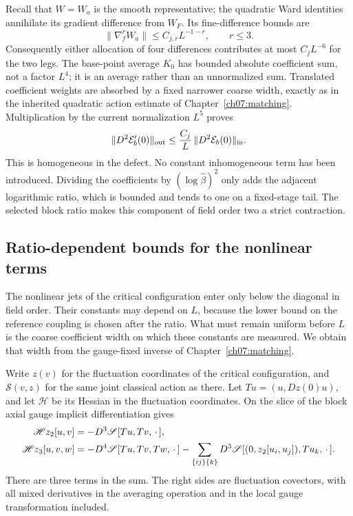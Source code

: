 Recall that $W=W_a$ is the smooth representative; the quadratic Ward
identities annihilate its gradient difference from $W_F$.
Its fine-difference bounds are
\[
                  \|\nabla_f^rW_a\|\le C_{j,r}L^{-1-r},
                                  \qquad r\le3.
\]
Consequently either allocation of four differences contributes at most
$C_jL^{-6}$ for the two legs. The base-point average $K_0$ has bounded
absolute coefficient sum, not a factor $L^4$; it is an average rather
than an unnormalized sum. Translated coefficient weights are absorbed
by a fixed narrower coarse width, exactly as in the inherited quadratic
action estimate of Chapter~\ref{ch07:matching}. Multiplication by the
current normalization $L^5$ proves
\begin{equation}
             \|D^2\mathcal E'_b(0)\|_{\rm out}
                  \le \frac{C_j}{L}\,
                            \|D^2\mathcal E_b(0)\|_{\rm in}.
 \label{ch17:quadratic-current-contraction}
\end{equation}
This is homogeneous in the defect. No constant inhomogeneous term has
been introduced. Dividing the coefficients by $(\log\widehat\beta)^2$
only adds the adjacent logarithmic ratio, which is bounded and tends
to one on a fixed-stage tail. The selected block ratio makes this
component of field order two a strict contraction.

\subsection{Ratio-dependent bounds for the nonlinear terms}

The nonlinear jets of the critical configuration enter only below the diagonal in field
order. Their constants may depend on $L$, because the lower bound on the reference coupling is
chosen after the ratio. What must remain uniform before $L$ is the
coarse coefficient width on which these constants are measured.
We obtain that width from the gauge-fixed inverse of
Chapter~\ref{ch07:matching}.

Write $z(v)$ for the fluctuation coordinates of the critical configuration, and
$\mathscr S(v,z)$ for the same joint classical action as there.
Let $T u=(u,Dz(0)u)$, and let $\mathscr H$ be its Hessian in the fluctuation coordinates.
On the slice of the block axial gauge implicit differentiation gives
\begin{align}
 \mathscr H z_2[u,v]
    &=-D^3\mathscr S[T u,T v,\,\cdot\,],\notag\\
 \mathscr H z_3[u,v,w]
    &=-D^4\mathscr S[T u,T v,T w,\,\cdot\,]
      -\sum_{\{ij\}\{k\}}
             D^3\mathscr S[(0,z_2[u_i,u_j]),T u_k,\,\cdot\,].
 \label{ch17:stationary-higher-jets}
\end{align}
There are three terms in the sum. The right sides are fluctuation
covectors, with all mixed derivatives in the averaging operation and in the local gauge transformation included.

